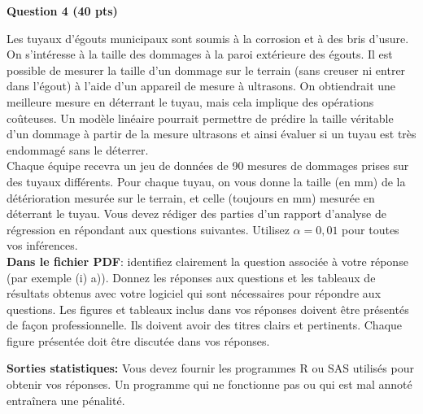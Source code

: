 \documentclass[letter, 11pt]{article}
\begin{document}
\newpage

\vspace{0.2 in}
\textbf{Question 4 (40 pts)} 

Les tuyaux d'égouts municipaux sont soumis à la corrosion et à des bris d'usure.  On s'intéresse à la taille des dommages à la paroi extérieure des égouts. Il est possible de mesurer la taille d'un dommage sur le terrain (sans creuser ni entrer dans l'égout) à l'aide d'un appareil de mesure à ultrasons. On obtiendrait une meilleure mesure en déterrant le tuyau, mais cela implique des opérations coûteuses. %
Un modèle linéaire pourrait permettre de prédire la taille véritable d'un dommage  à partir de la mesure ultrasons et ainsi évaluer si un tuyau est très endommagé sans le déterrer. \\

Chaque équipe recevra un jeu de données de 90 mesures de dommages prises sur des tuyaux différents. %
Pour chaque tuyau, on vous donne la taille (en mm) de la détérioration mesurée sur le terrain, et celle (toujours en mm) mesurée en déterrant le tuyau.  Vous devez rédiger des parties d'un rapport d'analyse de régression en répondant aux questions suivantes. Utilisez $\alpha = 0,01$ pour toutes vos inférences. \\

{\bf Dans le fichier PDF}: identifiez clairement la question associée à votre réponse (par exemple (i) a)). Donnez les réponses aux questions et les tableaux de résultats obtenus avec votre logiciel qui sont nécessaires pour
répondre aux questions. Les figures et tableaux inclus dans vos réponses doivent être présentés de façon professionnelle. Ils doivent avoir des titres clairs et pertinents. Chaque figure présentée doit être discutée dans vos réponses. 

\textbf{Sorties statistiques:}
Vous devez fournir les programmes R ou SAS utilisés pour obtenir vos réponses. Un programme qui ne fonctionne pas ou qui est mal annoté entraînera une pénalité. \\
\end{document}
